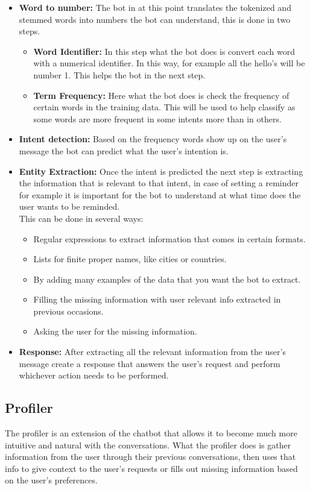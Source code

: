\begin{itemize}
	\item {\textbf{Word to number:} The bot in at this point translates the tokenized and stemmed words into numbers the bot can understand, this is done in two steps.\\
			\begin{itemize}
				\item {\textbf{Word Identifier:} In this step what the bot does is convert each word with a numerical identifier. In this way, for example all the hello’s will be number 1. This helps the bot in the next step.}
				\item {\textbf{Term Frequency:} Here what the bot does is check the frequency of certain words in the training data. This will be used to help classify as some words are more frequent in some intents more than in others.}
			\end{itemize}	
		}
	\item {\textbf{Intent detection:} Based on the frequency words show up on the user’s message the bot can predict what the user’s intention is.}
	\item {\textbf{Entity Extraction:} Once the intent is predicted the next step is extracting the information that is relevant to that intent, in case of setting a reminder for example it is important for the bot to understand at what time does the user wants to be reminded.\\
	This can be done in several ways:\\ 
			\begin{itemize}
				\item {Regular expressions to extract information that comes in certain formats.}
				\item {Lists for finite proper names, like cities or countries.}
				\item {By adding many examples of the data that you want the bot to extract.}
				\item {Filling the missing information with user relevant info extracted in previous occasions.}
				\item {Asking the user for the missing information.}
			\end{itemize}
		}
	\item {\textbf{Response:} After extracting all the relevant information from the user’s message create a response that answers the user’s request and perform whichever action needs to be performed.}
\end{itemize}

\subsection{Profiler}\label{sec:chap3_cha_pro}
The profiler is an extension of the chatbot that allows it to become much more intuitive and natural with the conversations. What the profiler does is gather information from the user through their previous conversations, then uses that info to give context to the user’s requests or fills out missing information based on the user’s preferences.\\

